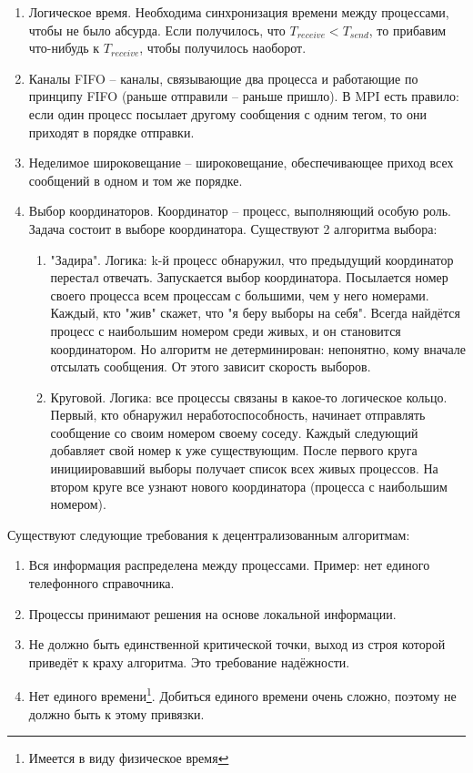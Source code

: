 \documentclass[a4paper,12pt]{article}
\begin{document}
	\begin{enumerate}
		\item Логическое время. Необходима синхронизация времени между процессами, чтобы не было
		абсурда. Если получилось, что $T_{receive}<T_{send}$, то прибавим что-нибудь к 
		$T_{receive}$, чтобы получилось наоборот.
		\item Каналы FIFO -- каналы, связывающие два процесса и работающие по принципу FIFO
		(раньше отправили -- раньше пришло). В MPI есть правило: если один процесс посылает
		другому сообщения с одним тегом, то они приходят в порядке отправки.
		\item Неделимое широковещание -- широковещание, обеспечивающее приход всех сообщений в 
		одном и том же порядке.
		\item Выбор координаторов. Координатор -- процесс, выполняющий особую роль. Задача
		состоит в выборе координатора. Существуют 2 алгоритма выбора:
		\begin{enumerate}
			\item "Задира". Логика: k-й процесс обнаружил, что предыдущий координатор перестал
			отвечать. Запускается выбор координатора. Посылается номер своего процесса всем
			процессам с большими, чем у него номерами. Каждый, кто "жив" скажет, что "я беру 
			выборы на себя". Всегда найдётся процесс с наибольшим номером среди живых, и он 
			становится координатором. Но алгоритм не детерминирован: непонятно, кому вначале
			отсылать сообщения. От этого зависит скорость выборов.
			\item Круговой. Логика: все процессы связаны в какое-то логическое кольцо. Первый,
			кто обнаружил неработоспособность, начинает отправлять сообщение со своим номером
			своему соседу. Каждый следующий добавляет свой номер к уже существующим. После
			первого круга инициировавший выборы получает список всех живых процессов. На втором
			круге все узнают нового координатора (процесса с наибольшим номером).
		\end{enumerate}
	\end{enumerate}
	Существуют следующие требования к децентрализованным алгоритмам:
	\begin{enumerate}
		\item Вся информация распределена между процессами. Пример: нет единого телефонного
		справочника.
		\item Процессы принимают решения на основе локальной информации.
		\item Не должно быть единственной критической точки, выход из строя которой приведёт к
		краху алгоритма. Это требование надёжности.
		\item Нет единого времени\footnote{Имеется в виду физическое время}. Добиться единого
		времени очень сложно, поэтому не должно быть к этому привязки.
	\end{enumerate}
\end{document}
